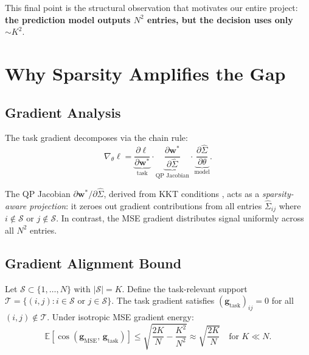 \documentclass[11pt]{article}
\newcommand{\bw}{\mathbf{w}}
\newcommand{\bSigma}{\hat{\Sigma}}
\newcommand{\cS}{\mathcal{S}}
\begin{document}
This final point is the structural observation that motivates our entire project: \textbf{the prediction model outputs $N^2$ entries, but the decision uses only $\sim K^2$}.

\section{Why Sparsity Amplifies the Gap}
\label{sec:theory}

\subsection{Gradient Analysis}

The task gradient decomposes via the chain rule:
\begin{equation}
  \nabla_\theta \ell = \underbrace{\frac{\partial \ell}{\partial \bw^*}}_{\text{task}} \cdot \underbrace{\frac{\partial \bw^*}{\partial \bSigma}}_{\text{QP Jacobian}} \cdot \underbrace{\frac{\partial \bSigma}{\partial \theta}}_{\text{model}}.
  \label{eq:chain}
\end{equation}

The QP Jacobian $\partial \bw^* / \partial \bSigma$, derived from KKT conditions \citep{amos2017optnet}, acts as a \emph{sparsity-aware projection}: it zeroes out gradient contributions from all entries $\bSigma_{ij}$ where $i \notin \cS$ or $j \notin \cS$. In contrast, the MSE gradient distributes signal uniformly across all $N^2$ entries.

\subsection{Gradient Alignment Bound}

\begin{proposition}
\label{prop:alignment}
Let $\cS \subset \{1,\ldots,N\}$ with $|\cS| = K$. Define the task-relevant support $\mathcal{T} = \{(i,j) : i \in \cS \text{ or } j \in \cS\}$. The task gradient satisfies $(\mathbf{g}_{\mathrm{task}})_{ij} = 0$ for all $(i,j) \notin \mathcal{T}$. Under isotropic MSE gradient energy:
\begin{equation}
\mathbb{E}\!\left[\cos(\mathbf{g}_{\mathrm{MSE}},\, \mathbf{g}_{\mathrm{task}})\right] \leq \sqrt{\frac{2K}{N} - \frac{K^2}{N^2}} \approx \sqrt{\frac{2K}{N}} \quad \text{for } K \ll N.
\label{eq:alignment}
\end{equation}
\end{proposition}
\end{document}
